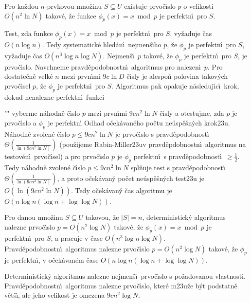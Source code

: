 \documentclass[a4paper,12pt]{article}
\begin{document}
Pro ka\v zdou $n$-prvkovou mno\v zinu $S\subseteq 
U$ 
existuje prvo\-\v c\'\i s\-lo $p$ o velikosti $O(n^2\ln N)$ takov\'e, \v ze 
funkce $\phi_p(x)=x\bmod p$ je perfektn\'\i\ pro $S$.  
\endproclaim
\medskip

\flushpar Test, zda funkce $\phi_p(x)=x\bmod p$ je perfektn\'\i\ 
pro $S$, 
vy\v zaduje \v cas $O(n\log n)$. Tedy systematick\'e hled\'an\'\i\ 
nejmen\v s\'\i ho $p$, \v ze $\phi_p$ je perfektn\'\i\ pro $S$, vy\v zaduje \v cas 
$O(n^3\log n\log N)$. Nejmen\v s\'\i\ $p$ takov\'e, \v ze $\phi_p$ je perfektn\'\i\ 
pro $S$, 
je prvo\v c\'\i slo. Navrhneme pravd\v epodob\-nostn\'\i\ algoritmus 
pro nalezen\'\i\ $p$. Pro dostate\v cn\v e velk\'e $n$ mezi 
prvn\'\i mi $9c\ln D$ \v c\'\i sly je alespo\v n polovina tako\-v\'ych 
prvo\v c\'\i sel $p$, \v ze $\phi_p$ je perfektn\'\i\ pro $S$. Algoritmus pak 
opakuje n\'asleduj\'\i c\'\i\ krok, dokud nenalezne perfektn\'\i\ funkci
\roster
\item"{}"
vyberme n\'ahodn\v e \v c\'\i slo $p$ mezi prvn\'\i mi $9cn^2\ln 
N$ 
\v c\'\i sly a otestujme, zda $p$ je prvo\v c\'\i slo a $\phi_p$ je perfektn\'\i
\endroster
\flushpar Odhad o\v cek\'avan\'eho po\v ctu ne\'usp\v e\v sn\'ych krok\accent23u.\newline 
N\'ahodn\v e zvolen\'e \v c\'\i slo $p\le 9cn^2\ln N$ je prvo\v c\'\i slo s 
pravd\v epo\-dob\-nost\'\i\ $\Theta (\frac 1{\ln(9cn^2\ln N)})$ 
(pou\v zi\-je\-me Rabin-Miller\accent23uv pravd\v epdobnostn\'\i\ algoritmus na testov\'en\'\i\ prvo\v c\'\i sel) a pro prvo\v c\'\i slo $
p$ je $\phi_p$ 
perfektn\'\i\ s prav\-d\v e\-po\-dob\-nost\'\i\ $\ge\frac 12$. Tedy n\'ahodn\v e zvolen\'e 
\v c\'\i slo $p\le 9cn^2\ln N$ spl\v nuje test s pravd\v e\-po\-dob\-nost\'\i\ 
$\Theta (\frac 1{\ln(9cn^2\ln N)})$, a proto o\v cek\'a\-va\-n\'y po\v cet ne\'usp\v e\v sn\'ych 
test\accent23u je $O(\ln(9cn^2\ln N))$. Tedy o\v cek\'a\-van\'y \v cas 
algoritmu je $O(n\log n(\log n+\log\log N))$.

\proclaim{V\v eta}Pro danou mno\v zinu $S\subseteq U$ takovou, \v ze 
$|S|=n$, deterministick\'y algoritmus nalezne prvo\v c\'\i slo 
$p=O(n^2\log N)$ takov\'e, \v ze $\phi_p(x)=x\bmod p$ je perfektn\'\i\ 
pro $S$, a pracuje v \v case $O(n^3\log n\log N)$. Pravd\v epodobnostn\'\i\ 
algoritmus nalezne pr\-vo\v c\'\i slo $p=O(n^2\log N)$ takov\'e, \v ze 
$\phi_p$ je perfektn\'\i , v o\v cek\'ava\-n\'em \v case 
$O(n\log n(\log n+\log\log N))$.
\endproclaim

\flushpar Deterministick\'y algoritmus nalezne nejmen\v s\'\i\ prvo\v c\'\i slo s 
po\-\v za\-dovanou vlastnost\'\i .  Prav\-d\v e\-podobnostn\'\i\ algoritmus 
nalezne prvo\v c\'\i slo, kter\'e m\accent23u\v ze b\'yt podstatn\v e 
v\v et\v s\'\i , ale jeho velikost je omezena $9cn^2\log N$. 
\medskip
\end{document}
